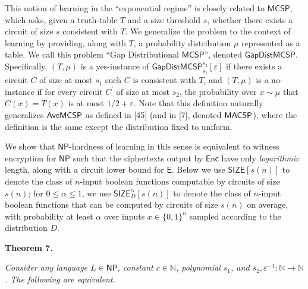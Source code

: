 This notion of learning in the “exponential regime” is closely related to ${\mathsf{MCSP}}$, which asks, given a truth-table $T$ and a size threshold $s$, whether there exists a circuit of size $s$ consistent with $T$. We generalize the problem to the context of learning by providing, along with $T$, a probability distribution $\mu$ represented as a table. We call this problem “Gap Distributional ${\mathsf{MCSP}}$”, denoted ${\mathsf{GapDistMCSP}}$. Specifically, $(T,\mu)$ is a yes-instance of ${\mathsf{GapDistMCSP}}_{s_{1}}^{s_{2}}[\varepsilon]$ if there exists a circuit $C$ of size at most $s_{1}$ such $C$ is consistent with $T$, and $(T,\mu)$ is a no-instance if for every circuit $C^{\prime}$ of size at most $s_{2}$, the probability over $x\sim\mu$ that $C(x)=T(x)$ is at most $1/2+\varepsilon$. Note that this definition naturally generalizes ${\sf Ave}{\mathsf{MCSP}}$ as defined in [45] (and in [7], denoted ${\sf MACSP}$), where the definition is the same except the distribution fixed to uniform.\par




We show that ${\mathsf{NP}}$-hardness of learning in this sense is equivalent to witness encryption for ${\mathsf{NP}}$ such that the ciphertexts output by ${\mathsf{Enc}}$ have only \emph{logarithmic} length, along with a circuit lower bound for ${\mathsf{E}}$. Below we use ${\mathsf{SIZE}}[s(n)]$ to denote the class of $n$-input boolean functions computable by circuits of size $s(n)$; for $0\leq\alpha\leq 1$, we use ${\mathsf{SIZE}}_{D}^{\alpha}[s(n)]$ to denote the class of $n$-input boolean functions that can be computed by circuits of size $s(n)$ on average, with probability at least $\alpha$ over inputs $x\in\{0,1\}^{n}$ sampled according to the distribution $D$.\par





\par\medskip\noindent\textbf{
\textbf{Theorem 7}\textbf{.}
}\par



\emph{Consider any language $L\in{\mathsf{NP}}$, constant $c\in\mathbb{N}$, polynomial $s_{1}$, and $s_{2},\varepsilon^{-1}:\mathbb{N}\to\mathbb{N}$. The following are equivalent.}\par


